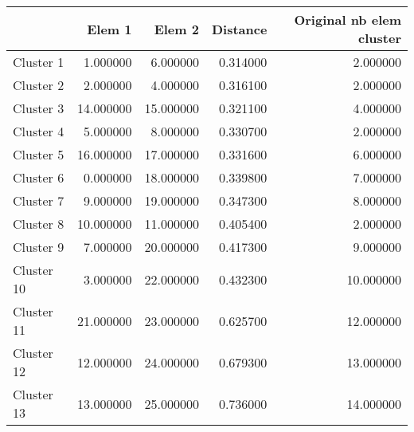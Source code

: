 \begin{tabular}{lrrrr}
\toprule
 & Elem 1 & Elem 2 & Distance & Original nb elem cluster \\
\midrule
Cluster 1 & 1.000000 & 6.000000 & 0.314000 & 2.000000 \\
Cluster 2 & 2.000000 & 4.000000 & 0.316100 & 2.000000 \\
Cluster 3 & 14.000000 & 15.000000 & 0.321100 & 4.000000 \\
Cluster 4 & 5.000000 & 8.000000 & 0.330700 & 2.000000 \\
Cluster 5 & 16.000000 & 17.000000 & 0.331600 & 6.000000 \\
Cluster 6 & 0.000000 & 18.000000 & 0.339800 & 7.000000 \\
Cluster 7 & 9.000000 & 19.000000 & 0.347300 & 8.000000 \\
Cluster 8 & 10.000000 & 11.000000 & 0.405400 & 2.000000 \\
Cluster 9 & 7.000000 & 20.000000 & 0.417300 & 9.000000 \\
Cluster 10 & 3.000000 & 22.000000 & 0.432300 & 10.000000 \\
Cluster 11 & 21.000000 & 23.000000 & 0.625700 & 12.000000 \\
Cluster 12 & 12.000000 & 24.000000 & 0.679300 & 13.000000 \\
Cluster 13 & 13.000000 & 25.000000 & 0.736000 & 14.000000 \\
\bottomrule
\end{tabular}
